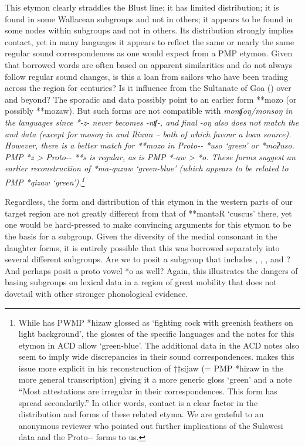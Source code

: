 This etymon clearly straddles the Blust line; it has limited
distribution; it is found in some Wallacean subgroups
and not in others; it appears to be found in some nodes within
subgroups and not in others.
Its distribution strongly implies contact,
yet in many languages it appears to reflect the same or nearly
the same regular sound correspondences as one would expect from a PMP etymon.
Given that borrowed words are often based on apparent similarities
and do not always follow regular sound changes,
is this a loan from  sailors who have been trading across
the region for centuries? Is it influence from the Sultanate
of Goa () over 
and beyond? 
The sporadic  and  data possibly
point to an earlier form **mozo (or possibly **mozaw).
But such forms are not compatible with \it{monʧoŋ/monsoŋ} in
the  languages since *-z- never becomes \it{-nʧ-},
and final \it{-oŋ} also does not match the 
and  data (except for \it{mosoŋ} in 
and Ili{\Q}uun -- both of which favour a loan source).
However, there is a better match for **mozo in Proto--
*uso ‘green’ \citep[486]{Mead1998} or *moʔuso.
PMP *z > Proto-- **s is regular,
as is PMP *-aw > *o.
These forms suggest an earlier reconstruction of *ma-quzaw ‘green-blue’
(which appears to be related to PMP *qizaw ‘green’).\footnote{
		While \citet{BlustTrussel2020} has PWMP *hizaw glossed as ‘fighting
		cock with greenish feathers on light background’,
		the glosses of the specific languages
		and the notes for this etymon in ACD allow ‘green-blue’.
		The additional data in the ACD notes also seem to imply wide
		discrepancies in their sound correspondences.
		\citet[982]{Wolff2010} makes this issue more explicit in his
		reconstruction of ††sijaw (= PMP *hizaw in the more general transcription)
		giving it a more generic gloss ‘green’
		and a note “Most attestations are irregular in their correspondences.
		This form has spread secondarily.” In other words,
		contact is a clear factor in the distribution
		and forms of these related etyma.
		We are grateful to an anonymous reviewer who pointed out further
		implications of the Sulawesi data
		and the Proto-- forms to us.}

Regardless,
the form and distribution of this etymon in the western parts
of our target region are not greatly different from that of **mantəR
‘cuscus’ there, yet one would be hard-pressed to make convincing arguments for
this etymon to be the basis for a subgroup.
Given the diversity of the medial consonant in the daughter forms,
it is entirely possible that this was borrowed separately into several different subgroups.
Are we to posit a subgroup that includes ,
, ,  and ? And perhaps posit a proto vowel *o as well? Again,
this illustrates the dangers of basing subgroups on lexical data
in a region of great mobility that does not dovetail with other stronger phonological evidence.

